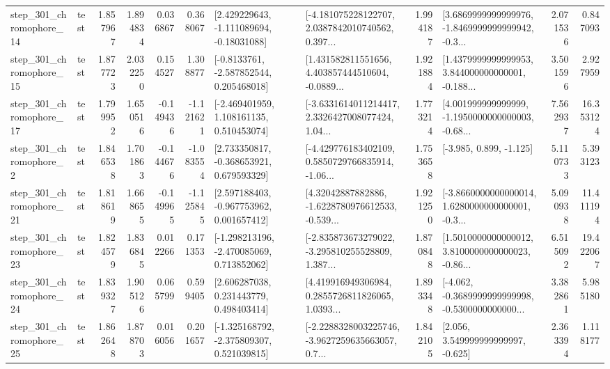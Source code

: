\begin{tabular}{llrrrrllrlrr}
  step\_301\_chromophore\_14 &      test &      1.857967 &    1.894834 &      0.036867 &  0.368067 &    [2.429229643, -1.111089694, -0.18031088] &  [-4.181075228122707, 2.0387842010740562, 0.397... &       1.994187 &  [3.6869999999999976, -1.8469999999999942, -0.3... &            2.071536 &          0.847093 \\
  step\_301\_chromophore\_15 &      test &      1.877723 &    2.032250 &      0.154527 &  1.308877 &     [-0.8133761, -2.587852544, 0.205468018] &  [1.431582811551656, 4.403857444510604, -0.0889... &       1.921884 &  [1.4379999999999953, 3.844000000000001, -0.188... &            3.501596 &          2.927959 \\
  step\_301\_chromophore\_17 &      test &      1.799952 &    1.650516 &     -0.149436 & -1.121621 &    [-2.469401959, 1.108161135, 0.510453074] &  [-3.6331614011214417, 2.3326427008077424, 1.04... &       1.773214 &  [4.001999999999999, -1.1950000000000003, -0.68... &            7.562937 &         16.353124 \\
   step\_301\_chromophore\_2 &      test &      1.846538 &    1.701863 &     -0.144676 & -1.083554 &    [2.733350817, -0.368653921, 0.679593329] &  [-4.429776183402109, 0.5850729766835914, -1.06... &       1.753658 &                            [-3.985, 0.899, -1.125] &            5.110733 &          5.393123 \\
  step\_301\_chromophore\_21 &      test &      1.818619 &    1.668655 &     -0.149965 & -1.125845 &    [2.597188403, -0.967753962, 0.001657412] &  [4.32042887882886, -1.6228780976612533, -0.539... &       1.921250 &  [-3.8660000000000014, 1.6280000000000001, -0.3... &            5.090938 &         11.411194 \\
  step\_301\_chromophore\_23 &      test &      1.824579 &    1.836845 &      0.012266 &  0.171353 &   [-1.298213196, -2.470085069, 0.713852062] &  [-2.835873673279022, -3.295810255528809, 1.387... &       1.870848 &  [1.5010000000000012, 3.8100000000000023, -0.86... &            6.515092 &         19.422067 \\
  step\_301\_chromophore\_24 &      test &      1.839327 &    1.905126 &      0.065799 &  0.599405 &     [2.606287038, 0.231443779, 0.498403414] &  [4.419916949306984, 0.2855726811826065, 1.0393... &       1.893348 &  [-4.062, -0.3689999999999998, -0.5300000000000... &            3.382861 &          5.985180 \\
  step\_301\_chromophore\_25 &      test &      1.862648 &    1.878703 &      0.016056 &  0.201657 &   [-1.325168792, -2.375809307, 0.521039815] &  [-2.2288328003225746, -3.9627259635663057, 0.7... &       1.842105 &                 [2.056, 3.549999999999997, -0.625] &            2.363394 &          1.118177 \\

\end{tabular}
